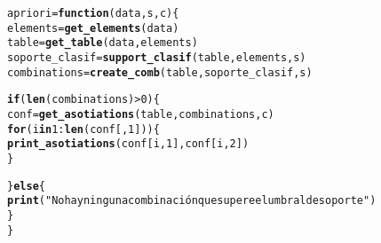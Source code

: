\documentclass[12pt]{report}\usepackage[]{graphicx}\usepackage[dvipsnames]{xcolor}
\makeatletter
\newcommand{\hlnum}[1]{\textcolor[rgb]{0.686,0.059,0.569}{#1}}%
\newcommand{\hlstr}[1]{\textcolor[rgb]{0.192,0.494,0.8}{#1}}%
\newcommand{\hlopt}[1]{\textcolor[rgb]{0,0,0}{#1}}%
\newcommand{\hlstd}[1]{\textcolor[rgb]{0.345,0.345,0.345}{#1}}%
\newcommand{\hlkwa}[1]{\textcolor[rgb]{0.161,0.373,0.58}{\textbf{#1}}}%
\newcommand{\hlkwb}[1]{\textcolor[rgb]{0.69,0.353,0.396}{#1}}%
\newcommand{\hlkwc}[1]{\textcolor[rgb]{0.333,0.667,0.333}{#1}}%
\newcommand{\hlkwd}[1]{\textcolor[rgb]{0.737,0.353,0.396}{\textbf{#1}}}%
\newenvironment{kframe}{%
 \def\at@end@of@kframe{}%
 \ifinner\ifhmode%
  \def\at@end@of@kframe{\end{minipage}}%
  \begin{minipage}{\columnwidth}%
 \fi\fi%
 \def\FrameCommand##1{\hskip\@totalleftmargin \hskip-\fboxsep
 \colorbox{shadecolor}{##1}\hskip-\fboxsep
     \hskip-\linewidth \hskip-\@totalleftmargin \hskip\columnwidth}%
 \MakeFramed {\advance\hsize-\width
   \@totalleftmargin\z@ \linewidth\hsize
   \@setminipage}}%
 {\par\unskip\endMakeFramed%
 \at@end@of@kframe}
\newenvironment{knitrout}{}{} %
\makeatother
\begin{document}
\begin{knitrout}
\color{fgcolor}\begin{kframe}
\begin{alltt}
\hlstd{apriori} \hlkwb{=} \hlkwa{function}\hlstd{(}\hlkwc{data}\hlstd{,} \hlkwc{s}\hlstd{,} \hlkwc{c}\hlstd{) \{}
        \hlstd{elements} \hlkwb{=} \hlkwd{get_elements}\hlstd{(data)}
        \hlstd{table} \hlkwb{=} \hlkwd{get_table}\hlstd{(data, elements)}
        \hlstd{soporte_clasif} \hlkwb{=} \hlkwd{support_clasif}\hlstd{(table, elements, s)}
        \hlstd{combinations} \hlkwb{=} \hlkwd{create_comb}\hlstd{(table, soporte_clasif, s)}

        \hlkwa{if} \hlstd{(}\hlkwd{len}\hlstd{(combinations)} \hlopt{>} \hlnum{0}\hlstd{) \{}
                \hlstd{conf} \hlkwb{=} \hlkwd{get_asotiations}\hlstd{(table, combinations, c)}
                \hlkwa{for} \hlstd{(i} \hlkwa{in} \hlnum{1}\hlopt{:}\hlkwd{len}\hlstd{(conf[,}\hlnum{1}\hlstd{]))\{}
                        \hlkwd{print_asotiations}\hlstd{(conf[i,}\hlnum{1}\hlstd{], conf[i,}\hlnum{2}\hlstd{])}
                \hlstd{\}}

        \hlstd{\}} \hlkwa{else} \hlstd{\{}
                \hlkwd{print}\hlstd{(}\hlstr{"No hay ninguna combinación que supere el umbral de soporte"}\hlstd{)}
        \hlstd{\}}
\hlstd{\}}
\end{alltt}
\end{kframe}
\end{knitrout}
			
\end{document}
